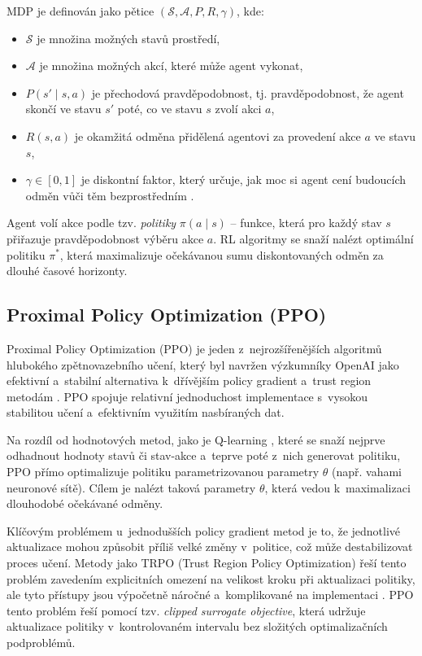 MDP je definován jako pětice $(\mathcal{S},\mathcal{A},P,R,\gamma)$, kde:

\begin{itemize}
    \item $\mathcal{S}$ je množina možných stavů prostředí,
    \item $\mathcal{A}$ je množina možných akcí, které může agent vykonat,
    \item $P(s' \mid s,a)$ je přechodová pravděpodobnost, tj. pravděpodobnost, že agent skončí ve stavu
    $s'$ poté, co ve stavu $s$ zvolí akci $a$,
    \item $R(s,a)$ je okamžitá odměna přidělená agentovi za provedení akce $a$ ve stavu $s$,
    \item $\gamma \in [0,1]$ je diskontní faktor, který určuje, jak moc si agent cení budoucích odměn
    vůči těm bezprostředním \cite{Sutton2018}.
\end{itemize}

Agent volí akce podle tzv. \textit{politiky} $\pi(a\mid s)$ – funkce, která pro každý stav $s$ přiřazuje
pravděpodobnost výběru akce $a$. RL algoritmy se snaží nalézt optimální politiku $\pi^*$, která maximalizuje
očekávanou sumu diskontovaných odměn za dlouhé časové horizonty.

\subsection{Proximal Policy Optimization (PPO)}

Proximal Policy Optimization (PPO) je jeden z~nejrozšířenějších algoritmů hlubokého zpětnovazebního učení,
který byl navržen výzkumníky OpenAI jako efektivní a~stabilní alternativa k~dřívějším policy gradient a~trust region
metodám \cite{PPOOpenAI}\cite{Schulman2017}\cite{Jochec2024}. PPO spojuje relativní jednoduchost implementace s~vysokou
stabilitou učení a~efektivním využitím nasbíraných dat.

Na rozdíl od hodnotových metod, jako je Q-learning \cite{Watkins1992}\cite{Sutton2018}, které se snaží
nejprve odhadnout hodnoty stavů či stav-akce a~teprve poté z~nich generovat politiku, PPO přímo optimalizuje
politiku parametrizovanou parametry $\theta$ (např. vahami neuronové sítě). Cílem je nalézt taková
parametry $\theta$, která vedou k~maximalizaci dlouhodobé očekávané odměny.

Klíčovým problémem u~jednodušších policy gradient metod je to, že jednotlivé aktualizace mohou
způsobit příliš velké změny v~politice, což může destabilizovat proces učení. Metody jako TRPO
(Trust Region Policy Optimization) řeší tento problém zavedením explicitních omezení na velikost
kroku při aktualizaci politiky, ale tyto přístupy jsou výpočetně náročné a~komplikované na implementaci
\cite{Schulman2015}. PPO tento problém řeší pomocí tzv. \textit{clipped surrogate objective}, která
udržuje aktualizace politiky v~kontrolovaném intervalu bez složitých optimalizačních podproblémů.

